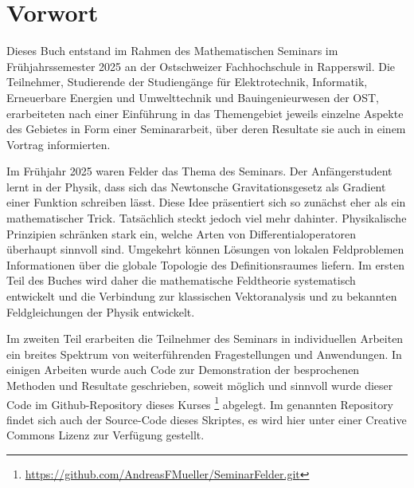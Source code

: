 %
%
%
\chapter*{Vorwort}


Dieses Buch entstand im Rahmen des Mathematischen Seminars
im Frühjahrssemester 2025 an der Ostschweizer Fachhochschule in Rapperswil.
Die Teilnehmer, Studierende der Studiengänge für Elektrotechnik, Informatik,
Erneuerbare Energien und Umwelttechnik und Bauingenieurwesen
der OST, erarbeiteten nach einer Einführung in das Themengebiet jeweils
einzelne Aspekte des Gebietes in Form einer Seminararbeit, über
deren Resultate sie auch in einem Vortrag informierten. 

Im Frühjahr 2025 waren Felder das Thema des Seminars.
Der Anfängerstudent lernt in der Physik, dass sich das Newtonsche
Gravitationsgesetz als Gradient einer Funktion schreiben lässt.
Diese Idee präsentiert sich so zunächst eher als ein mathematischer
Trick.
Tatsächlich steckt jedoch viel mehr dahinter.
Physikalische Prinzipien schränken stark ein, welche Arten von
Differentialoperatoren überhaupt sinnvoll sind.
Umgekehrt können Lösungen von lokalen Feldproblemen Informationen
über die globale Topologie des Definitionsraumes liefern.
Im ersten Teil des Buches wird daher die mathematische Feldtheorie
systematisch entwickelt und die Verbindung zur klassischen
Vektoranalysis und zu bekannten Feldgleichungen der Physik entwickelt.

Im zweiten Teil erarbeiten die Teilnehmer des Seminars in individuellen
Arbeiten ein breites Spektrum von weiterführenden Fragestellungen
und Anwendungen.
In einigen Arbeiten wurde auch Code zur Demonstration der 
besprochenen Methoden und Resultate geschrieben, soweit
möglich und sinnvoll wurde dieser Code im Github-Repository
%
dieses Kurses%
\footnote{\url{https://github.com/AndreasFMueller/SeminarFelder.git}}
\cite{buch:repo}
abgelegt.
Im genannten Repository findet sich auch der Source-Code dieses
Skriptes, es wird hier unter einer Creative Commons Lizenz
zur Verfügung gestellt.

